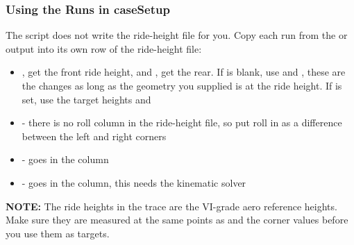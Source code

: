 \subsubsection{Using the Runs in caseSetup}
The script does not write the ride-height file for you. Copy each run from the  or  output into its own row of the ride-height file:
\begin{itemize}
    \item {},  get the front ride height, and ,  get the rear. If  is blank, use  and , these are the changes as long as the geometry you supplied is at the  ride height. If  is set, use the target heights  and 
    \item {} - there is no roll column in the ride-height file, so put roll in as a difference between the left and right corners
    \item {} - goes in the  column
    \item {} - goes in the  column, this needs the kinematic solver
\end{itemize}
\textbf{NOTE:} The ride heights in the trace are the VI-grade aero reference heights. Make sure they are measured at the same points as  and the corner values before you use them as targets.

